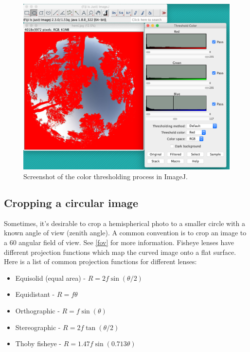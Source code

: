 \documentclass[11pt,a4paper]{article}
\newcommand\file[1]{\texttt{\color{file}#1}}  %
\begin{document}
\begin{figure}[H]
	\includegraphics[width=0.8\linewidth]{colour_threshold}
	\caption{Screenshot of the color thresholding process in ImageJ.}
	\label{colour_threshold}
\end{figure}

\begin{minipage}{\linewidth}

\end{minipage}

\subsection{Cropping a circular image} \label{circle}

Sometimes, it's desirable to crop a hemispherical photo to a smaller circle with a known angle of view (zenith angle). A common convention is to crop an image to a 60\textdegree{} angular field of view. See \autoref{fov} for more information. Fisheye lenses have different projection functions which map the curved image onto a flat surface. Here is a list of common projection functions for different lenses:

\begin{itemize}
	\item{Equisolid (equal area) - $R = 2f\sin{(\theta/2)}$}
	\item{Equidistant - $R = f\theta$}
	\item{Orthographic - $R = f\sin{(\theta)}$}
	\item{Stereographic - $R = 2f\tan{(\theta/2)}$}
	\item{Thoby fisheye - $R = 1.47f\sin{(0.713\theta)}$}
\end{itemize}
\end{document}
